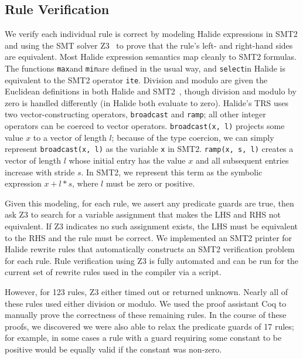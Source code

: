 \documentclass[acmsmall,review]{acmart}\settopmatter{printfolios=true,printccs=false,printacmref=false}
\newcommand{\hmax}[0]{\texttt{max}}
\newcommand{\hmin}[0]{\texttt{min}}
\newcommand{\hsel}[0]{\texttt{select}}
\newcommand{\NumPredicatesRelaxed}{{\color{black} 17}\xspace}
\begin{document}
\subsection{Rule Verification}
\label{sec:verification}
We verify each individual rule is correct by modeling Halide
expressions in SMT2 and using the SMT solver Z3~\cite{de2008z3} to
prove that the rule's left- and right-hand sides are equivalent. Most Halide expression
semantics map cleanly to SMT2 formulas. The functions \hmax and
\hmin are defined in the usual way, and \hsel in
Halide is equivalent to the SMT2 operator \texttt{ite}. Division and
modulo are given the Euclidean definitions in both Halide and
SMT2~\cite{boute1992euclidean}, though division and modulo by zero is handled
differently (in Halide both evaluate to zero).
Halide's TRS uses two vector-constructing operators, \texttt{broadcast} and \texttt{ramp}; all
other integer operators can be coerced to vector operators. 
\texttt{broadcast(x, l)} projects some value $x$ to a vector of length $l$; because of
the type coercion, we can simply represent \texttt{broadcast(x, l)} as the variable
\texttt{x} in SMT2. \texttt{ramp(x, s, l)} creates a vector of length $l$
whose initial entry has the value $x$ and all subsequent entries increase with
stride $s$. In SMT2, we represent this term as the symbolic expression $x + l *
s$, where $l$ must be zero or positive.

Given this modeling, for each rule, we assert any predicate guards are true, then
ask Z3 to search for a variable assignment that makes the LHS and RHS not
equivalent.  If Z3 indicates no such assignment exists, the LHS must be equivalent to
the RHS and the rule must be correct. We implemented an SMT2 printer for 
Halide rewrite rules that automatically constructs an SMT2 verification problem for each rule.
Rule verification using Z3 is fully automated
and can be run for the current set of rewrite rules used in the compiler via a script.

However, for 123
rules, Z3 either timed out or returned unknown. Nearly all of these rules used
either division or modulo. We used the proof assistant Coq to manually prove the
correctness of these remaining rules. In the course of these proofs, we
discovered we were also able to relax the predicate guards of \NumPredicatesRelaxed
rules; for example, in some cases a rule
with a guard requiring some constant to be positive would be equally valid
if the constant was non-zero.
\end{document}
